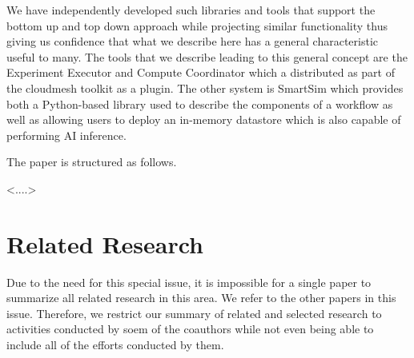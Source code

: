 \documentclass[utf8]{FrontiersinVancouver} %
\begin{document}
We have independently developed such libraries and tools that support the bottom up and top down approach while projecting similar functionality thus giving us confidence that what we describe here has a general characteristic useful to many.
The tools that we describe leading to this general concept are the Experiment Executor and Compute Coordinator which a distributed as part of the cloudmesh toolkit as a plugin. The other system is SmartSim which provides both a Python-based library used to describe the components of a workflow as well as allowing users to deploy an in-memory datastore which is also capable of performing AI inference. 

The paper is structured as follows.

<....> 


\section{Related Research}

Due to the need for this special issue, it is impossible for a single paper to summarize all related research in this area. We refer to the other papers in this issue. Therefore, we restrict our summary of related and selected research to activities conducted by soem of the coauthors while not even being able to include all of the efforts conducted by them.
\end{document}
